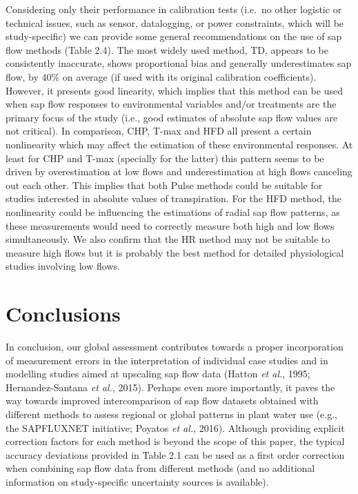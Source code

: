 \documentclass[11pt,twoside]{reedthesis}
\begin{document}
Considering only their performance in calibration tests (i.e.~no other
logistic or technical issues, such as sensor, datalogging, or power
constraints, which will be study-specific) we can provide some general
recommendations on the use of sap flow methods (Table 2.4). The most
widely used method, TD, appears to be consistently inaccurate, shows
proportional bias and generally underestimates sap flow, by 40\% on
average (if used with its original calibration coefficients). However,
it presents good linearity, which implies that this method can be used
when sap flow responses to environmental variables and/or treatments are
the primary focus of the study (i.e., good estimates of absolute sap
flow values are not critical). In comparison, CHP, T-max and HFD all
present a certain nonlinearity which may affect the estimation of these
environmental responses. At least for CHP and T-max (specially for the
latter) this pattern seems to be driven by overestimation at low flows
and underestimation at high flows canceling out each other. This implies
that both Pulse methods could be suitable for studies interested in
absolute values of transpiration. For the HFD method, the nonlinearity
could be influencing the estimations of radial sap flow patterns, as
these measurements would need to correctly measure both high and low
flows simultaneously. We also confirm that the HR method may not be
suitable to measure high flows but it is probably the best method for
detailed physiological studies involving low flows.\par

\section{Conclusions}\label{conclusions}

In conclusion, our global assessment contributes towards a proper
incorporation of measurement errors in the interpretation of individual
case studies and in modelling studies aimed at upscaling sap flow data
(Hatton \emph{et al.}, 1995; Hernandez-Santana \emph{et al.}, 2015).
Perhaps even more importantly, it paves the way towards improved
intercomparison of sap flow datasets obtained with different methods to
assess regional or global patterns in plant water use (e.g., the
SAPFLUXNET initiative; Poyatos \emph{et al.}, 2016). Although providing
explicit correction factors for each method is beyond the scope of this
paper, the typical accuracy deviations provided in Table 2.1 can be used
as a first order correction when combining sap flow data from different
methods (and no additional information on study-specific uncertainty
sources is available).\par
\end{document}
